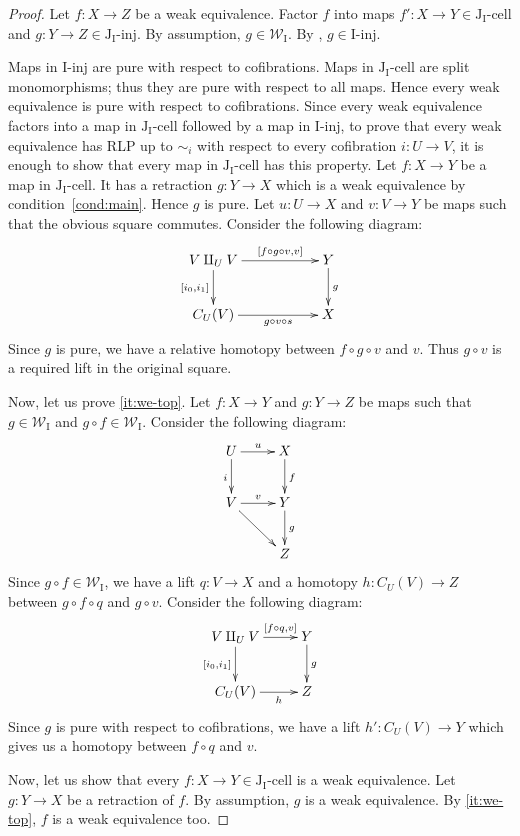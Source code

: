 \documentclass{tac}
\theoremstyle{definition}
\newcommand{\we}{\mathcal{W}}
\newcommand{\I}{\mathrm{I}}
\newcommand{\J}{\mathrm{J}}
\newcommand{\class}[2]{#1\text{-}\mathrm{#2}}
\newcommand{\Iinj}[1][\I]{\class{#1}{inj}}
\newcommand{\Icell}[1][\I]{\class{#1}{cell}}
\newcommand{\Jinj}[1][]{\Iinj[\J#1]}
\newcommand{\Jcell}[1][]{\Icell[\J#1]}
\newcommand{\cyli}{i}
\begin{document}
\begin{proof}
Let $f : X \to Z$ be a weak equivalence.
Factor $f$ into maps $f' : X \to Y \in \Jcell[_\I]$ and $g : Y \to Z \in \Jinj[_\I]$.
By assumption, $g \in \we_\I$.
By , $g \in \Iinj$.

Maps in $\Iinj$ are pure with respect to cofibrations.
Maps in $\Jcell[_\I]$ are split monomorphisms; thus they are pure with respect to all maps.
Hence every weak equivalence is pure with respect to cofibrations.
Since every weak equivalence factors into a map in $\Jcell[_\I]$ followed by a map in $\Iinj$,
to prove that every weak equivalence has RLP up to $\sim_i$ with respect to every cofibration $i : U \to V$,
it is enough to show that every map in $\Jcell[_\I]$ has this property.
Let $f : X \to Y$ be a map in $\Jcell[_\I]$.
It has a retraction $g : Y \to X$ which is a weak equivalence by condition~\eqref{cond:main}.
Hence $g$ is pure.
Let $u : U \to X$ and $v : V \to Y$ be maps such that the obvious square commutes.
Consider the following diagram:
\[ \xymatrix{ V \amalg_U V \ar[rr]^-{[f \circ g \circ v, v]} \ar[d]_{[\cyli_0,\cyli_1]} & & Y \ar[d]^g \\
              C_U(V) \ar[rr]_-{g \circ v \circ s} & & X
            } \]
Since $g$ is pure, we have a relative homotopy between $f \circ g \circ v$ and $v$.
Thus $g \circ v$ is a required lift in the original square.

Now, let us prove \eqref{it:we-top}.
Let $f : X \to Y$ and $g : Y \to Z$ be maps such that $g \in \we_\I$ and $g \circ f \in \we_\I$.
Consider the following diagram:
\[ \xymatrix{ U \ar[r]^u \ar[d]_i & X \ar[d]^f \\
              V \ar[r]^v \ar[rd]  & Y \ar[d]^g \\
                                  & Z
            } \]
Since $g \circ f \in \we_\I$, we have a lift $q : V \to X$ and a homotopy $h : C_U(V) \to Z$ between $g \circ f \circ q$ and $g \circ v$.
Consider the following diagram:
\[ \xymatrix{ V \amalg_U V \ar[r]^-{[f \circ q, v]} \ar[d]_{[\cyli_0,\cyli_1]} & Y \ar[d]^g \\
              C_U(V) \ar[r]_-h & Z
            } \]
Since $g$ is pure with respect to cofibrations, we have a lift $h' : C_U(V) \to Y$ which gives us a homotopy between $f \circ q$ and $v$.

Now, let us show that every $f : X \to Y \in \Jcell[_\I]$ is a weak equivalence.
Let $g : Y \to X$ be a retraction of $f$.
By assumption, $g$ is a weak equivalence.
By \eqref{it:we-top}, $f$ is a weak equivalence too.


\end{proof}
\end{document}
